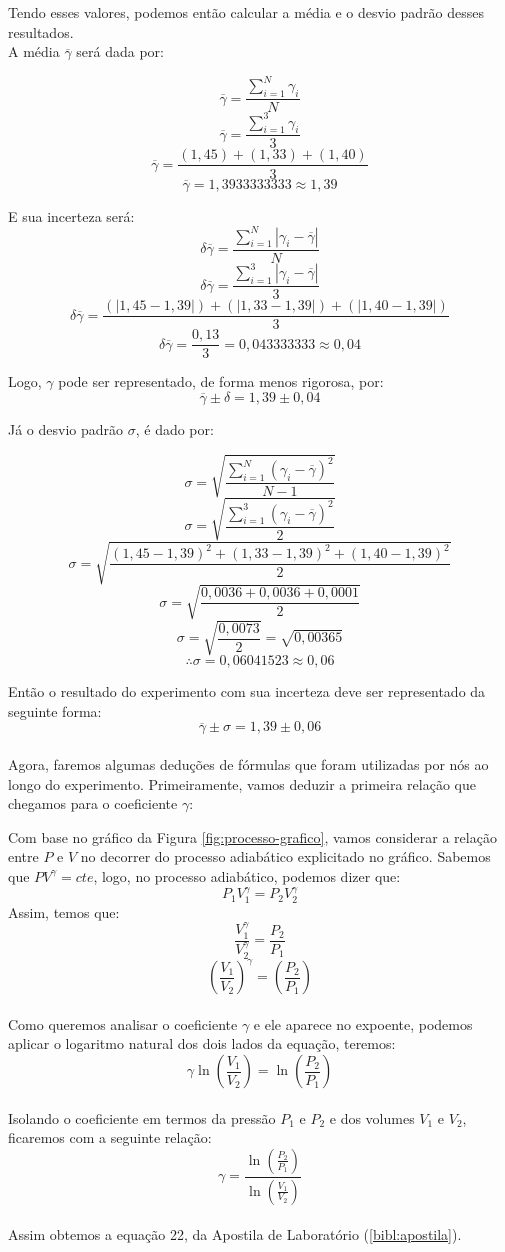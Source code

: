 Tendo esses valores, podemos então calcular a média e o desvio padrão desses resultados.\\

A média $\overline{\gamma}$ será dada por:

\[ \overline{\gamma} = \frac{\sum_{i=1}^{N} \gamma_i}{N}\]
\[ \overline{\gamma} = \frac{\sum_{i=1}^{3} \gamma_i}{3}\]
\[ \overline{\gamma} = \frac{(1,45) + (1,33) + (1,40)}{3}\]
\[ \overline{\gamma} = 1,3933333333 \approx 1,39\]

E sua incerteza será:\\
\[ \delta\overline{\gamma} = \frac{\sum_{i=1}^{N} |\gamma_i - \overline{\gamma}|}{N}\]
\[ \delta\overline{\gamma} = \frac{\sum_{i=1}^{3} |\gamma_i - \overline{\gamma}|}{3}\]
\[ \delta\overline{\gamma} = \frac{(|1,45 - 1,39|) + (|1,33 - 1,39|) + (|1,40 -1,39|) }{3}\]
\[ \delta\overline{\gamma} = \frac{0,13}{3} = 0,043333333 \approx 0,04\]

Logo, $\gamma$ pode ser representado, de forma menos rigorosa, por:
\[ \overline{\gamma} \pm \delta  = 1,39 \pm 0,04 \]

Já o desvio padrão $\sigma$, é dado por:

\[ \sigma = \sqrt{\frac{\sum_{i=1}^{N} (\gamma_i - \overline{\gamma})^2}{N-1}}\]
\[ \sigma = \sqrt{\frac{\sum_{i=1}^{3} (\gamma_i - \overline{\gamma})^2}{2}}\]
\[ \sigma = \sqrt{\frac{(1,45-1,39)^2 + (1,33-1,39)^2 + (1,40-1,39)^2}{2}}\]
\[ \sigma = \sqrt{\frac{0,0036 + 0,0036 + 0,0001}{2}}\]
\[ \sigma = \sqrt{\frac{0,0073}{2}} = \sqrt{0,00365} \]
\[ \therefore \sigma = 0,06041523 \approx 0,06 \]

Então o resultado do experimento com sua incerteza deve ser representado da seguinte forma:
\[ \overline{\gamma} \pm \sigma = 1,39 \pm 0,06\]\\

Agora, faremos algumas deduções de fórmulas que foram utilizadas por nós ao longo do experimento. Primeiramente, vamos deduzir a primeira relação que chegamos para o coeficiente $\gamma$:

Com base no gráfico da Figura \ref{fig:processo-grafico}, vamos considerar a relação entre $P$ e $V$ no decorrer do processo adiabático explicitado no gráfico. 
Sabemos que $P V^\gamma = cte $, logo, no processo adiabático, podemos dizer que:\\
\[P_1 V_1^\gamma = P_2 V_2^\gamma\]
Assim, temos que:
\[\frac{V_1^\gamma}{V_2^\gamma}  = \frac{P_2}{P_1}\]
\[\left(\frac{V_1}{V_2}\right)^\gamma  = \left(\frac{P_2}{P_1}\right)\]\\
Como queremos analisar o coeficiente $\gamma$ e ele aparece no expoente, podemos aplicar o logaritmo natural dos dois lados da equação, teremos:\\
\[\gamma \ln\left(\frac{V_1}{V_2}\right)  = \ln \left(\frac{P_2}{P_1}\right)\]\\
Isolando o coeficiente em termos da pressão $P_1$ e $P_2$ e dos volumes $V_1$ e $V_2$, ficaremos com a seguinte relação:\\
\[\gamma  = \frac{\ln{\left(\frac{P_2}{P_1}\right)}}{\ln{\left(\frac{V_1}{V_2}\right)}} \]\\ 
Assim obtemos a equação 22, da Apostila de Laboratório (\ref{bibl:apostila}).\\

